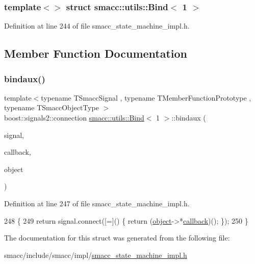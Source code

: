 \subsubsection*{template$<$$>$\newline
struct smacc\+::utils\+::\+Bind$<$ 1 $>$}



Definition at line 244 of file smacc\+\_\+state\+\_\+machine\+\_\+impl.\+h.



\subsection{Member Function Documentation}
\mbox{\label{structsmacc_1_1utils_1_1Bind_3_011_01_4_a5704d3cff0b914fc899ff385ff8f8bc2}} 
\subsubsection{\texorpdfstring{bindaux()}{bindaux()}}
{\footnotesize\ttfamily template$<$typename T\+Smacc\+Signal , typename T\+Member\+Function\+Prototype , typename T\+Smacc\+Object\+Type $>$ \\
boost\+::signals2\+::connection \hyperlink{structsmacc_1_1utils_1_1Bind}{smacc\+::utils\+::\+Bind}$<$ 1 $>$\+::bindaux (\begin{DoxyParamCaption}\item[{T\+Smacc\+Signal \&}]{signal,  }\item[{T\+Member\+Function\+Prototype}]{callback,  }\item[{T\+Smacc\+Object\+Type $\ast$}]{object }\end{DoxyParamCaption})\hspace{0.3cm}{\ttfamily [inline]}}



Definition at line 247 of file smacc\+\_\+state\+\_\+machine\+\_\+impl.\+h.


\begin{DoxyCode}
248   \{
249     \textcolor{keywordflow}{return} signal.connect([=]() \{ \textcolor{keywordflow}{return} (\hyperlink{classobject}{object}->*\hyperlink{servers_2opencv__perception__node_2opencv__perception__node_8cpp_a050e697bd654facce10ea3f6549669b3}{callback})(); \});
250   \}
\end{DoxyCode}


The documentation for this struct was generated from the following file\+:\begin{DoxyCompactItemize}
\item 
smacc/include/smacc/impl/\hyperlink{smacc__state__machine__impl_8h}{smacc\+\_\+state\+\_\+machine\+\_\+impl.\+h}\end{DoxyCompactItemize}
